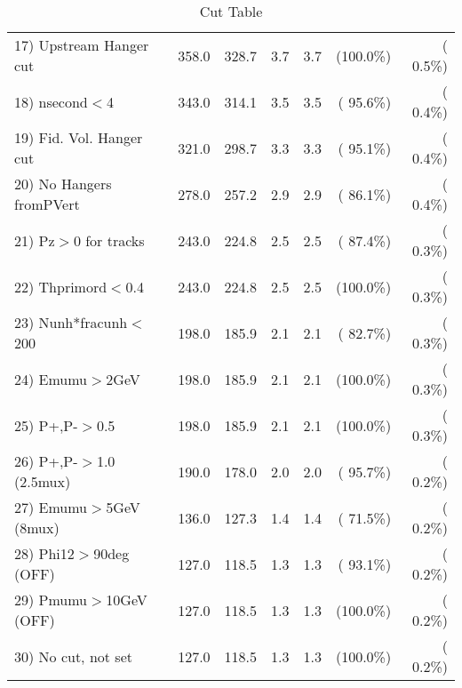 \begin{table}[h!]
\begin{tabular}{||l||r|r|r|r|r|r||}
 17) Upstream Hanger cut  &        358.0 &        328.7 &          3.7 &          3.7 & (100.0\%) & (  0.5\%) \\
 18) nsecond$<$4          &        343.0 &        314.1 &          3.5 &          3.5 & ( 95.6\%) & (  0.4\%) \\
 19) Fid. Vol. Hanger cut &        321.0 &        298.7 &          3.3 &          3.3 & ( 95.1\%) & (  0.4\%) \\
 20) No Hangers fromPVert &        278.0 &        257.2 &          2.9 &          2.9 & ( 86.1\%) & (  0.4\%) \\
 21) Pz$>$0 for tracks    &        243.0 &        224.8 &          2.5 &          2.5 & ( 87.4\%) & (  0.3\%) \\
 22) Thprimord$<$0.4      &        243.0 &        224.8 &          2.5 &          2.5 & (100.0\%) & (  0.3\%) \\
 23) Nunh*fracunh$<$200   &        198.0 &        185.9 &          2.1 &          2.1 & ( 82.7\%) & (  0.3\%) \\
 24) Emumu$>$2GeV         &        198.0 &        185.9 &          2.1 &          2.1 & (100.0\%) & (  0.3\%) \\
 25) P+,P-$>$0.5          &        198.0 &        185.9 &          2.1 &          2.1 & (100.0\%) & (  0.3\%) \\
 26) P+,P-$>$1.0 (2.5mux) &        190.0 &        178.0 &          2.0 &          2.0 & ( 95.7\%) & (  0.2\%) \\
 27) Emumu$>$5GeV  (8mux) &        136.0 &        127.3 &          1.4 &          1.4 & ( 71.5\%) & (  0.2\%) \\
 28) Phi12$>$90deg  (OFF) &        127.0 &        118.5 &          1.3 &          1.3 & ( 93.1\%) & (  0.2\%) \\
 29) Pmumu$>$10GeV  (OFF) &        127.0 &        118.5 &          1.3 &          1.3 & (100.0\%) & (  0.2\%) \\
 30) No cut, not set      &        127.0 &        118.5 &          1.3 &          1.3 & (100.0\%) & (  0.2\%) \\
 \hline
 \hline
 \end{tabular}
 \caption{Cut Table           }
 \label{tab-cutcohjpsi-mumu_anuecc}
 \end{table}
